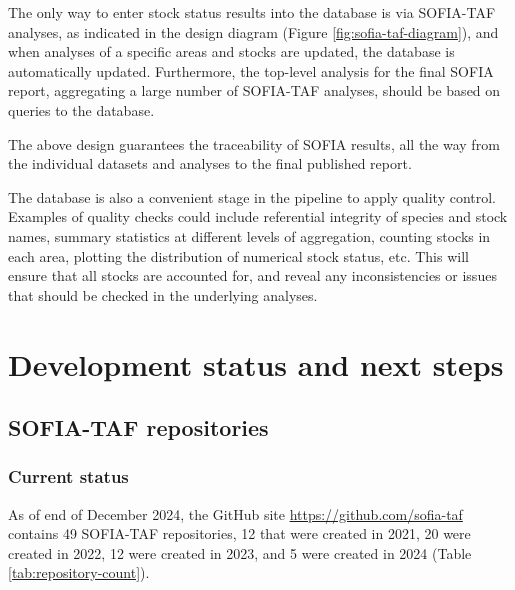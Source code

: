 \documentclass[12pt]{article}
\newcommand\blue[1]{\textcolor{darkblue}{#1}}
\begin{document}
The only way to enter stock status results into the database is via SOFIA-TAF
analyses, as indicated in the design diagram (Figure
\ref{fig:sofia-taf-diagram}), and when analyses of a specific areas and stocks
are updated, the database is automatically updated. Furthermore, the top-level
analysis for the final SOFIA report, aggregating a large number of SOFIA-TAF
analyses, should be based on queries to the database.

The above design guarantees the traceability of SOFIA results, all the way from
the individual datasets and analyses to the final published report.

The database is also a convenient stage in the pipeline to apply quality
control. Examples of quality checks could include referential integrity of
species and stock names, summary statistics at different levels of aggregation,
counting stocks in each area, plotting the distribution of numerical stock
status, etc. This will ensure that all stocks are accounted for, and reveal any
inconsistencies or issues that should be checked in the underlying analyses.

\newpage


\section{Development status and next steps}

\subsection{SOFIA-TAF repositories}

\subsubsection{Current status}

As of end of December 2024, the GitHub site
\blue{\url{https://github.com/sofia-taf}} contains 49 SOFIA-TAF repositories, 12
that were created in 2021, 20 were created in 2022, 12 were created in 2023, and
5 were created in 2024 (Table \ref{tab:repository-count}).
\end{document}
